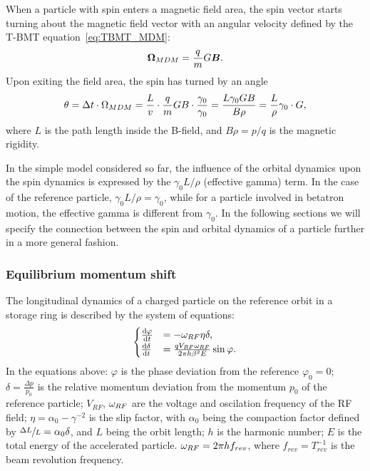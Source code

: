 \documentclass{article}
\begin{document}
When a particle with spin enters a magnetic field area, the spin vector starts turning about the magnetic field vector with an angular velocity defined by the T-BMT equation~\eqref{eq:TBMT_MDM}:
\begin{equation*}
  \boldsymbol{\Omega}_{MDM} = \frac qm G\boldsymbol B.
\end{equation*}
Upon exiting the field area, the spin has turned by an angle
\begin{equation*}
  \theta = \Delta t\cdot\Omega_{MDM} = \frac Lv \cdot \frac qm GB\cdot \frac{\gamma_0}{\gamma_0} = \frac{L\gamma_0 GB}{B\rho} = \frac L\rho\gamma_0\cdot G,
\end{equation*}
where $L$ is the path length inside the B-field, and $B\rho = p/q$ is the magnetic rigidity.

In the simple model considered so far, the influence of the orbital dynamics upon the spin dynamics is expressed by the $\gamma_0 L/\rho$ (effective gamma) term. In the case of the reference particle, $\gamma_0L/\rho = \gamma_0$, while for a particle involved in betatron motion, the effective gamma is different from $\gamma_0$. In the following sections we will specify the connection between the spin and orbital dynamics of a particle further in a more general fashion.

\subsubsection{Equilibrium momentum shift}
The longitudinal dynamics of a charged particle on the reference orbit in a storage ring is described by the system of equations:
\begin{equation*}
  \begin{cases}
    \frac{\mathrm{d} {\varphi}}{\mathrm{d} t} &= -\omega_{RF}\eta\delta, \\
    \frac{\mathrm{d} {\delta}}{\mathrm{d} t} &= \frac{q V_{RF}\omega_{RF}}{2\pi h\beta^2E}\sin\varphi.
  \end{cases}
\end{equation*}
In the equations above: $\varphi$ is the phase deviation from the reference $\varphi_0 = 0$; $\delta = \frac{\Delta p}{p_0}$ is the relative momentum deviation from the momentum $p_0$ of the reference particle; $V_{RF}$, $\omega_{RF}$ are the voltage and oscilation frequency of the RF field; $\eta = \alpha_0 - \gamma^{-2}$ is the slip factor, with $\alpha_0$ being the compaction factor defined by $\sfrac{\Delta L}{L} = \alpha_0\delta$, and $L$ being the orbit length; $h$ is the harmonic number; $E$ is the total energy of the accelerated particle. $\omega_{RF} = 2\pi h f_{rev}$, where $f_{rev}=T_{rev}^{-1}$ is the beam revolution frequency.
\end{document}
